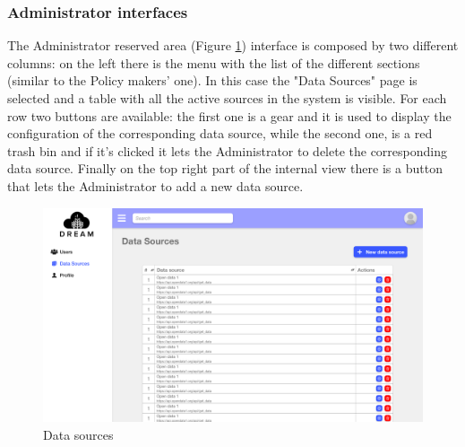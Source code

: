 \subsubsection{Administrator interfaces}
The Administrator reserved area (Figure \ref{fig:datasources}) interface is composed by two different columns: on the left there is the menu with the list of the different sections (similar to the Policy makers' one). In this case the "Data Sources" page is selected and a table with all the active sources in the system is visible. For each row two buttons are available: the first one is a gear and it is used to display the configuration of the corresponding data source, while the second one, is a red trash bin and if it's clicked it lets the Administrator to delete the corresponding data source. Finally on the top right part of the internal view there is a button that lets the Administrator to add a new data source.  
\begin{figure}[h!]
    \centering
    \includegraphics[scale=0.2]{images/interfaces/data_sources.png}
    \caption{Data sources}
    \label{fig:datasources}
\end{figure}
\FloatBarrier
